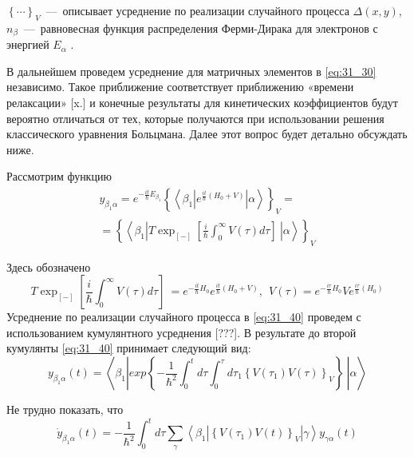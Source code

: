 \noindent ${\left\{\cdots \right\}}_V$~---~описывает усреднение по реализации случайного процесса $\Delta \left(x,y\right)$, $n_{\beta }$~---~равновесная функция распределения Ферми-Дирака для электронов с энергией $E_{\alpha }$ .

В дальнейшем проведем усреднение для матричных элементов в \eqref{eq:31_30} независимо. {\color{red}Такое приближение соответствует приближению «времени релаксации» [x.]} и конечные результаты для кинетических коэффициентов будут вероятно отличаться от тех, которые получаются при использовании решения классического уравнения Больцмана. Далее этот вопрос будет детально обсуждать ниже.

\noindent Рассмотрим функцию
\begin{multline} \label{eq:31_40}
y_{{\beta }_1\alpha }=e^{-\frac{it}{\hbar }E_{{\beta }_1}}{\left\{\left\langle {\beta }_1\left|e^{\frac{it}{\hbar }\left(H_0+V\right)}\right|\alpha \right\rangle \right\}}_V=\\
={\left\{\left\langle {\beta }_1\left|T{{\exp}_{[-]} \left[\frac{i}{\hbar }\int^{\infty }_0{V\left(\tau \right)d \tau }\right]\ }\right|\alpha \right\rangle \right\}}_V
\end{multline}

\noindent Здесь обозначено
\[
T{{\exp}_{\left[-\right]} \left[\frac{i}{\hbar }\int^{\infty }_0{V\left(\tau \right)d \tau }\right]\ }=e^{-\frac{it}{\hbar }H_0}e^{\frac{it}{\hbar }\left(H_0+V\right)},\ \ V\left(\tau \right)=e^{-\frac{i\tau }{\hbar }H_0}Ve^{\frac{i\tau }{\hbar }\left(H_0\right)}
\] 
{\color{red}Усреднение по реализации случайного процесса в \eqref{eq:31_40} проведем с использованием кумулянтного усреднения [???].} В результате до второй кумулянты \eqref{eq:31_40} принимает следующий вид:
\begin{equation} \label{eq:31_50}
y_{{\beta }_1\alpha }\left(t\right)=\left\langle {\beta }_1\left|{exp \left\{-\frac{1}{{\hbar }^2}\int^t_0{d \tau \int^{\tau }_0{d {\tau }_1{\left\{V\left({\tau }_1\right)V\left(\tau \right)\right\}}_V}}\right\}\ }\right|\alpha \right\rangle
\end{equation} 

\noindent Не трудно показать, что
\begin{equation} \label{eq:31_60}
{\dot{y}}_{{\beta }_1\alpha }\left(t\right)=-\frac{1}{{\hbar }^2}\int^t_0{d \tau \sum_{\gamma }{\left\langle {\beta }_1\left|{\left\{V\left({\tau }_1\right)V\left(t\right)\right\}}_V\right|\gamma \right\rangle y_{\gamma \alpha }\left(t\right)}}
\end{equation} 

